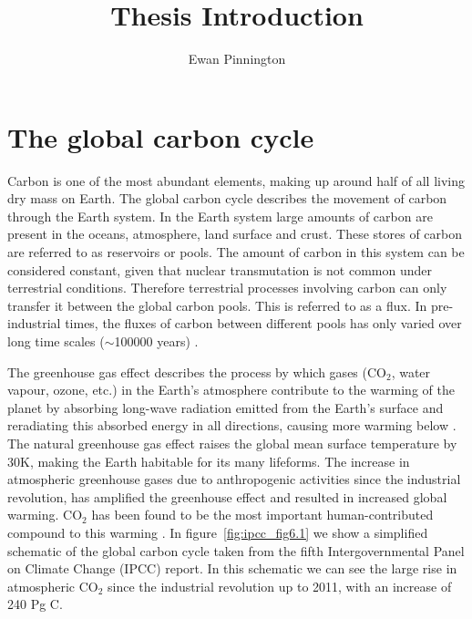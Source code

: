 \documentclass[12pt]{article}
\title{Thesis Introduction}
\author{Ewan Pinnington}
\begin{document}
\maketitle


\section{The global carbon cycle} \label{sec:global_c_cycle}

Carbon is one of the most abundant elements, making up around half of all living dry mass on Earth. The global carbon cycle describes the movement of carbon through the Earth system. In the Earth system large amounts of carbon are present in the oceans, atmosphere, land surface and crust. These stores of carbon are referred to as reservoirs or pools. The amount of carbon in this system can be considered constant, given that nuclear transmutation is not common under terrestrial conditions. Therefore terrestrial processes involving carbon can only transfer it between the global carbon pools. This is referred to as a flux. In pre-industrial times, the fluxes of carbon between different pools has only varied over long time scales (\(\sim\)100000 years) \citep{luthi2008high}.

The greenhouse gas effect describes the process by which gases (CO\(_{2}\), water vapour, ozone, etc.) in the Earth's atmosphere contribute to the warming of the planet by absorbing long-wave radiation emitted from the Earth's surface and reradiating this absorbed energy in all directions, causing more warming below \citep{mitchell1989greenhouse}. The natural greenhouse gas effect raises the global mean surface temperature by 30K, making the Earth habitable for its many lifeforms. The increase in atmospheric greenhouse gases due to anthropogenic activities since the industrial revolution, has amplified the greenhouse effect and resulted in increased global warming. CO\(_{2}\) has been found to be the most important human-contributed compound to this warming \citep{Falkowski291}. In figure~\ref{fig:ipcc_fig6.1} we show a simplified schematic of the global carbon cycle taken from the fifth Intergovernmental Panel on Climate Change (IPCC) report. In this schematic we can see the large rise in atmospheric CO\(_{2}\) since the industrial revolution up to 2011, with an increase of 240 Pg C.
\end{document}

